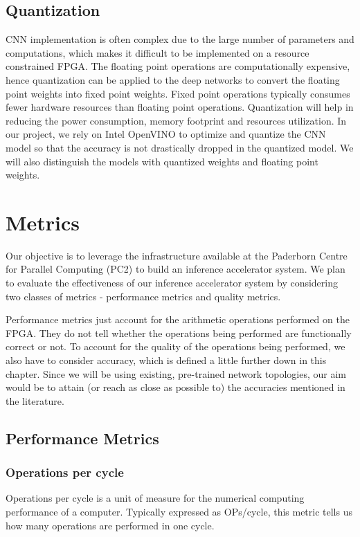 \documentclass[titlepage]{report}
\begin{document}
\section{Quantization }
CNN implementation is often complex due to the large number of parameters and computations, which makes it difficult to be implemented on a resource constrained FPGA. The floating point operations are computationally expensive, hence quantization can be applied to the deep networks to convert the floating point weights into fixed point weights. Fixed point operations typically consumes fewer hardware resources than floating point operations. Quantization will help in reducing the power consumption, memory footprint and resources utilization. In our project, we rely on Intel OpenVINO to optimize and quantize the CNN model so that the accuracy is not drastically dropped in the quantized model. We will also distinguish the models with quantized weights and floating point weights.


\chapter{Metrics}
Our objective is to leverage the infrastructure available at the Paderborn Centre for Parallel Computing (PC2) to build an inference accelerator system. We plan to evaluate the effectiveness of our inference accelerator system by considering two classes of metrics - performance metrics and quality metrics.  

Performance metrics just account for the arithmetic operations performed on the FPGA. They do not tell whether the operations being performed are functionally correct or not. To account for the quality of the operations being performed, we also have to consider accuracy, which is defined a little further down in this chapter. Since we will be using existing, pre-trained network topologies, our aim would be to attain (or reach as close as possible to)  the accuracies mentioned in the literature.

\section{Performance Metrics}

\subsection{Operations per cycle}
Operations per cycle is a unit of measure for the numerical computing performance of a computer. Typically expressed as OPs/cycle, this metric tells us how many operations are performed in one cycle.  
\end{document}
